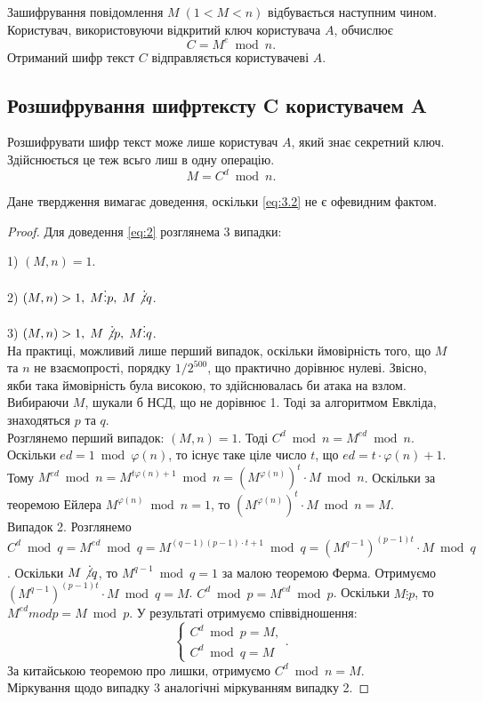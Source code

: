 Зашифрування повідомлення $M \; (1<M<n)$ відбувається наступним чином. Користувач, використовуючи відкритий ключ користувача $A$, обчислює 
\begin{equation}
C = M^e \bmod n.
\end{equation}
Отриманий шифр текст $C$ відправляється користувачеві $A$.

\subsection{Розшифрування шифртексту C користувачем A}

Розшифрувати шифр текст може лише користувач $A$, який знає секретний ключ. Здійснюється це теж всьго лиш в одну операцію.
\begin{equation} \label{eq:3.2} 
M = C ^ d \bmod n.
\end{equation}

Дане твердження вимагає доведення, оскільки \eqref{eq:3.2} не є офевидним фактом.
\begin{proof}
Для доведення \eqref{eq:2} розглянема 3 випадки:
\par1) $(M,n) = 1$.
\par2) $(M,n) > 1, \; M \vdots p, \; M \not\vdots q$.
\par3) $(M,n) > 1, \; M \not \vdots p, \; M \vdots q$.
\\
На практиці, можливий лише перший випадок, оскільки ймовірність того, що $M$ та $n$ не взаємопрості, порядку $1/2^{500}$, що практично дорівнює нулеві.
Звісно, якби така ймовірність була високою, то здійснювалась би атака на взлом. Вибираючи $M$, шукали б НСД, що не дорівнює 1. Тоді за алгоритмом Евкліда, знаходяться $p$ та $q$.\\
Розглянемо перший випадок: $(M,n) = 1$. Тоді $C ^ d \bmod n = M ^ {ed} \bmod n$. Оскільки $ed = 1 \bmod \varphi (n)$, то існує таке ціле число $t$, що $ed = t \cdot \varphi (n) + 1 $. Тому $M ^ {ed} \bmod n = M ^ {t \varphi (n) + 1} \bmod n = (M ^ {\varphi (n)}) ^ t \cdot M \bmod n$. Оскільки за теоремою Ейлера $M ^ {\varphi (n)} \bmod n = 1$, то $(M ^ {\varphi (n)}) ^ t \cdot M \bmod n = M$.\\
Випадок 2. Розглянемо $C ^ d \bmod q = M ^ {ed} \bmod q = M ^ {(q-1)(p-1) \cdot t + 1} \bmod q = (M ^ {q-1}) ^ {(p-1)t} \cdot M \bmod q$. Оскільки $M \not\vdots q$, то $M ^ {q-1} \bmod q = 1$ за малою теоремою Ферма. Отримуємо $(M ^ {q-1}) ^ {(p-1)t} \cdot M \bmod q = M$. $C ^ d \bmod p = M ^{ed} \bmod p$. Оскільки $M \vdots p$, то $M ^{ed} mod p = M \bmod p$. У результаті отримуємо співвідношення:
\begin{equation*}
\begin{cases}
    C ^ d \bmod p = M, \\
    C ^ d \bmod q = M
\end{cases}.
\end{equation*}
За китайською теоремою про лишки, отримуємо $C ^ d \bmod n = M$.\\
Міркування щодо випадку 3 аналогічні міркуванням випадку 2.
\end{proof}

